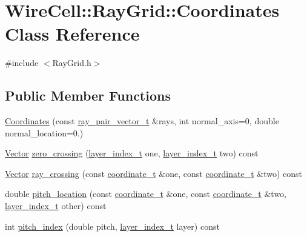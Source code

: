 \hypertarget{class_wire_cell_1_1_ray_grid_1_1_coordinates}{}\section{Wire\+Cell\+:\+:Ray\+Grid\+:\+:Coordinates Class Reference}
\label{class_wire_cell_1_1_ray_grid_1_1_coordinates}


{\ttfamily \#include $<$Ray\+Grid.\+h$>$}

\subsection*{Public Member Functions}
\begin{DoxyCompactItemize}
\item 
\hyperlink{class_wire_cell_1_1_ray_grid_1_1_coordinates_a4b9a727396d48768585d9d13916b88c1}{Coordinates} (const \hyperlink{namespace_wire_cell_a15d47ec1e9e43890c5cb09f1e9d77dd3}{ray\+\_\+pair\+\_\+vector\+\_\+t} \&rays, int normal\+\_\+axis=0, double normal\+\_\+location=0.)
\item 
\hyperlink{namespace_wire_cell_aa3c82d3ba85f032b0d278b7004846800}{Vector} \hyperlink{class_wire_cell_1_1_ray_grid_1_1_coordinates_ae0f4aa61c56a31334041565b3defdf6f}{zero\+\_\+crossing} (\hyperlink{namespace_wire_cell_1_1_ray_grid_ab7562e54b58eede813d5b70b5eb85812}{layer\+\_\+index\+\_\+t} one, \hyperlink{namespace_wire_cell_1_1_ray_grid_ab7562e54b58eede813d5b70b5eb85812}{layer\+\_\+index\+\_\+t} two) const
\item 
\hyperlink{namespace_wire_cell_aa3c82d3ba85f032b0d278b7004846800}{Vector} \hyperlink{class_wire_cell_1_1_ray_grid_1_1_coordinates_a74db6f8c7255ed721ac5c3b99e45902b}{ray\+\_\+crossing} (const \hyperlink{struct_wire_cell_1_1_ray_grid_1_1coordinate__t}{coordinate\+\_\+t} \&one, const \hyperlink{struct_wire_cell_1_1_ray_grid_1_1coordinate__t}{coordinate\+\_\+t} \&two) const
\item 
double \hyperlink{class_wire_cell_1_1_ray_grid_1_1_coordinates_ab201bc4926236a43676cbac2a7953158}{pitch\+\_\+location} (const \hyperlink{struct_wire_cell_1_1_ray_grid_1_1coordinate__t}{coordinate\+\_\+t} \&one, const \hyperlink{struct_wire_cell_1_1_ray_grid_1_1coordinate__t}{coordinate\+\_\+t} \&two, \hyperlink{namespace_wire_cell_1_1_ray_grid_ab7562e54b58eede813d5b70b5eb85812}{layer\+\_\+index\+\_\+t} other) const
\item 
int \hyperlink{class_wire_cell_1_1_ray_grid_1_1_coordinates_a8b371cd1c56cfdf12677d69f9e58fcbc}{pitch\+\_\+index} (double pitch, \hyperlink{namespace_wire_cell_1_1_ray_grid_ab7562e54b58eede813d5b70b5eb85812}{layer\+\_\+index\+\_\+t} layer) const

\end{DoxyCompactItemize}
